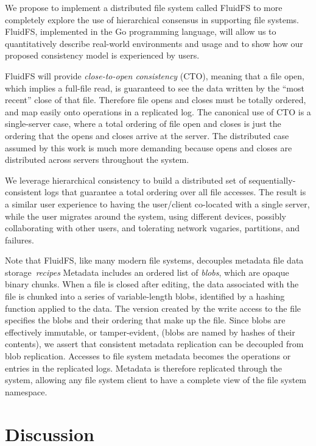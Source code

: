 \documentclass[sigconf]{acmart}
\begin{document}
We propose to implement a distributed file system called FluidFS to more completely explore
the use of hierarchical consensus in supporting file systems.
FluidFS, implemented in the Go programming language, will allow us to quantitatively
describe real-world environments and usage and to show how our proposed consistency
model is experienced by users.

FluidFS will provide \emph{close-to-open consistency} (CTO), meaning that a file
open, which implies a full-file read, is guaranteed to see the data written by the ``most recent'' close of
that file.
Therefore file opens and closes must be totally ordered, and map
easily onto operations in a replicated log.
The canonical use of CTO is a single-server case, where a total
ordering of file open and closes is just the ordering that the opens
and closes arrive at the server.
The distributed case assumed by this work is much more demanding because
opens and closes are distributed across servers throughout the system.

We leverage hierarchical consistency to build a distributed set of sequentially-consistent logs
that guarantee a total ordering over all file accesses.
The result is a similar user experience to having the user/client co-located with a single
server, while the user migrates around the system, using different devices, possibly
collaborating with other users, and tolerating network vagaries, partitions, and failures.

Note that FluidFS, like many modern file systems,
decouples metadata file
data storage~\emph{recipes}
Metadata includes an ordered list of \emph{blobs}, which are opaque binary chunks.
When a file is closed after editing, the data associated with the file is chunked into a
series of variable-length blobs, identified by a hashing function applied to
the data.
The version created by the write access to the file specifies the blobs and their ordering
that make up the file.
Since blobs are effectively immutable, or tamper-evident, (blobs are named by hashes of
their contents), we assert that consistent metadata replication can be decoupled from blob
replication.
Accesses to file system metadata becomes the operations or entries in the replicated logs.
Metadata is therefore replicated through the system, allowing any file
system client to have a complete view of the file system namespace.

\section{Discussion}
\end{document}
